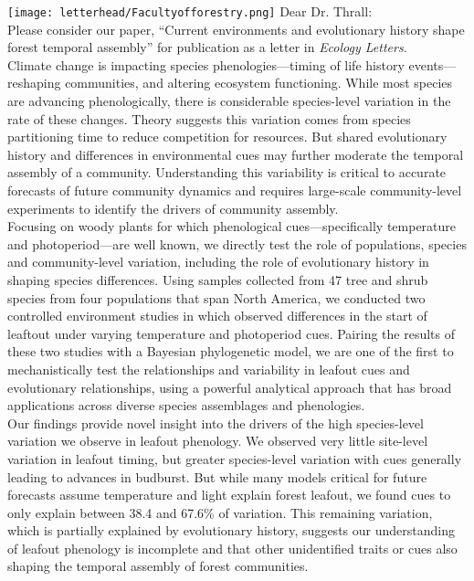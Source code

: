 \documentclass[11pt,a4paper]{article}
\begin{document}

\noindent \texttt{[image: letterhead/Facultyofforestry.png]}
\noindent Dear Dr. Thrall:
\vspace{1.5ex}\\
\noindent Please consider our paper, ``Current environments and evolutionary history shape forest temporal assembly'' for publication as a letter in \emph{Ecology Letters}. 
\vspace{1.5ex}\\ 
\noindent Climate change is impacting species phenologies---timing of life history events---reshaping communities, and altering ecosystem functioning. While most species are advancing phenologically, there is considerable species-level variation in the rate of these changes. Theory suggests this variation comes from species partitioning time to reduce competition for resources. But shared evolutionary history and differences in environmental cues may further moderate the temporal assembly of a community. Understanding this variability is critical to accurate forecasts of future community dynamics and requires large-scale community-level experiments to identify the drivers of community assembly.
\vspace{1.5ex}\\
\noindent Focusing on woody plants for which phenological cues---specifically temperature and photoperiod---are well known, we directly test the role of populations, species and community-level variation, including the role of evolutionary history in shaping species differences. Using samples collected from 47 tree and shrub species from four populations that span North America, we conducted two controlled environment studies in which observed differences in the start of leaftout under varying temperature and photoperiod cues. Pairing the results of these two studies with a Bayesian phylogenetic model, we are one of the first to mechanistically test the relationships and variability in leafout cues and evolutionary relationships, using a powerful analytical approach that has broad applications across diverse species assemblages and phenologies.
\vspace{1.5ex}\\
\noindent  Our findings provide novel insight into the drivers of the high species-level variation we observe in leafout phenology. We observed very little site-level variation in leafout timing, but greater species-level variation with cues generally leading to advances in budburst.  But while many models critical for future forecasts assume temperature and light explain forest leafout, we found cues to only explain between 38.4 and 67.6\% of variation. This remaining variation, which is partially explained by evolutionary history, suggests our understanding of leafout phenology is incomplete and that other unidentified traits or cues also shaping the temporal assembly of forest communities. 
\end{document}
